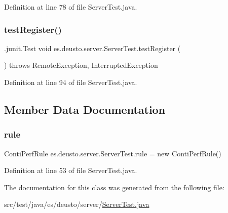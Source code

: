 Definition at line 78 of file Server\+Test.\+java.

\mbox{\label{classes_1_1deusto_1_1server_1_1_server_test_adb4299be45a2652280186729967b6f78}} 
\subsubsection{\texorpdfstring{test\+Register()}{testRegister()}}
{\footnotesize\ttfamily .junit.\+Test void es.\+deusto.\+server.\+Server\+Test.\+test\+Register (\begin{DoxyParamCaption}{ }\end{DoxyParamCaption}) throws Remote\+Exception, Interrupted\+Exception}



Definition at line 94 of file Server\+Test.\+java.



\subsection{Member Data Documentation}
\mbox{\label{classes_1_1deusto_1_1server_1_1_server_test_ab2224d0a68cc9af1c1abded7e27f4241}} 
\subsubsection{\texorpdfstring{rule}{rule}}
{\footnotesize\ttfamily Conti\+Perf\+Rule es.\+deusto.\+server.\+Server\+Test.\+rule = new Conti\+Perf\+Rule()}



Definition at line 53 of file Server\+Test.\+java.



The documentation for this class was generated from the following file\+:\begin{DoxyCompactItemize}
\item 
src/test/java/es/deusto/server/\hyperlink{_server_test_8java}{Server\+Test.\+java}\end{DoxyCompactItemize}
